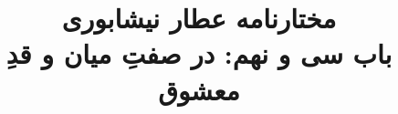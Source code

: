 \documentclass[14pt,b5paper]{article}
\begin{document}
\title{\Huge مختارنامه عطار نیشابوری \\
باب سی و نهم: در صفتِ میان و قدِ معشوق}
\author{ }
\date{ }
\maketitle
\newpage
\tableofcontents
\newpage

\newpage

\newpage

\newpage

\newpage

\newpage

\newpage

\newpage

\newpage

\newpage

\newpage

\newpage
\end{document}
